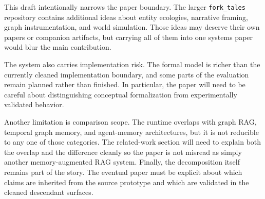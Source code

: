 This draft intentionally narrows the paper boundary. The larger \texttt{fork\_tales} repository contains additional ideas about entity ecologies, narrative framing, graph instrumentation, and world simulation. Those ideas may deserve their own papers or companion artifacts, but carrying all of them into one systems paper would blur the main contribution.

The system also carries implementation risk. The formal model is richer than the currently cleaned implementation boundary, and some parts of the evaluation remain planned rather than finished. In particular, the paper will need to be careful about distinguishing conceptual formalization from experimentally validated behavior.

Another limitation is comparison scope. The runtime overlaps with graph RAG, temporal graph memory, and agent-memory architectures, but it is not reducible to any one of those categories. The related-work section will need to explain both the overlap and the difference cleanly so the paper is not misread as simply another memory-augmented RAG system. Finally, the decomposition itself remains part of the story. The eventual paper must be explicit about which claims are inherited from the source prototype and which are validated in the cleaned descendant surfaces.
